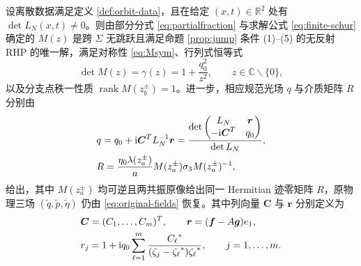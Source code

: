 \begin{theorem}\label{thm:N-orbit-RHP}
设离散数据满足定义 \ref{def:orbit-data}，且在给定 $(x,t)\in\mathbb R^2$ 处有 $\det L_N(x,t)\ne0$。则由部分分式 \eqref{eq:partialfraction} 与求解公式 \eqref{eq:finite-schur} 确定的 $M(z)$ 是跨 $\Sigma$ 无跳跃且满足命题 \ref{prop:jump} 条件 (1)--(5) 的无反射 RHP 的唯一解，满足对称性 \eqref{eq:Msym}、行列式恒等式
\begin{equation}\label{eq:detM}
\det M(z)=\gamma(z)=1+\dfrac{q_0^2}{z^2},\qquad z\in\mathbb C\mathbin{\backslash}\{0\},
\end{equation}
以及分支点秩一性质 $\operatorname{rank}M(z_b^\pm)=1$。进一步，相应规范光场 $q$ 与介质矩阵 $R$ 分别由
\begin{align}
&q=q_0+\mathrm{i}\boldsymbol C^T L_N^{-1}\boldsymbol r
=\dfrac{\det\begin{pmatrix}L_N&\boldsymbol r\\-\mathrm{i}\boldsymbol C^T&q_0\end{pmatrix}}{\det L_N},\label{eq:N-determinant-q}\\
&R=\dfrac{\eta_0\lambda(z_a^\pm)}{a}M(z_a^\pm)\sigma_3 M(z_a^\pm)^{-1},\label{eq:N-medium}
\end{align}
给出，其中 $M(z_a^\pm)$ 均可逆且两共振原像给出同一 Hermitian 迹零矩阵 $R$，原物理三场 $(\widetilde q,\widetilde p,\widetilde\eta)$ 仍由 \eqref{eq:original-fields} 恢复。其中列向量 $\boldsymbol C$ 与 $\boldsymbol r$ 分别定义为
\begin{equation}\label{eq:N-rhs}
\begin{aligned}
&\boldsymbol C=(C_1,\ldots,C_m)^T,\qquad
\boldsymbol r=(\boldsymbol f-A\boldsymbol g)e_1,\\
&r_j=1+\mathrm{i} q_0\sum\limits_{\ell=1}^{m}
\dfrac{{C_\ell}^{*}}{(\zeta_j-{\zeta_\ell}^{*}){\zeta_\ell}^{*}},\qquad j=1,\ldots,m.
\end{aligned}
\end{equation}
\end{theorem}

